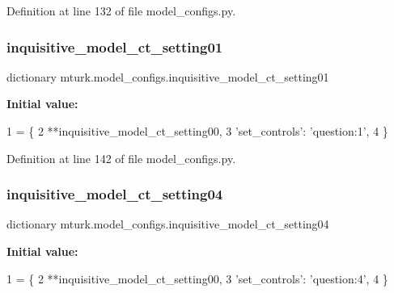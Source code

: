 Definition at line 132 of file model\+\_\+configs.\+py.

\mbox{\label{namespacemturk_1_1model__configs_a455699f26b796dbd0e03d64bf895c03f}} 
\subsubsection{\texorpdfstring{inquisitive\+\_\+model\+\_\+ct\+\_\+setting01}{inquisitive\_model\_ct\_setting01}}
{\footnotesize\ttfamily dictionary mturk.\+model\+\_\+configs.\+inquisitive\+\_\+model\+\_\+ct\+\_\+setting01}

{\bfseries Initial value\+:}
\begin{DoxyCode}
1 =  \{
2     **inquisitive\_model\_ct\_setting00,
3     \textcolor{stringliteral}{'set\_controls'}: \textcolor{stringliteral}{'question:1'},
4 \}
\end{DoxyCode}


Definition at line 142 of file model\+\_\+configs.\+py.

\mbox{\label{namespacemturk_1_1model__configs_aac628bb64ee97c325733042e98cce5c9}} 
\subsubsection{\texorpdfstring{inquisitive\+\_\+model\+\_\+ct\+\_\+setting04}{inquisitive\_model\_ct\_setting04}}
{\footnotesize\ttfamily dictionary mturk.\+model\+\_\+configs.\+inquisitive\+\_\+model\+\_\+ct\+\_\+setting04}

{\bfseries Initial value\+:}
\begin{DoxyCode}
1 =  \{
2     **inquisitive\_model\_ct\_setting00,
3     \textcolor{stringliteral}{'set\_controls'}: \textcolor{stringliteral}{'question:4'},
4 \}
\end{DoxyCode}


